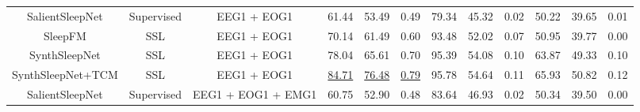 \begin{table*}[!htbp]
{{\begin{tabular}{c|c|c|ccc|ccc|ccc}
\hline
SalientSleepNet \cite{ref9}                                                                       & Supervised                                                                                 & EEG1
  + EOG1                              & 61.44          & 53.49          & 0.49                                                                      & 79.34          & 45.32          & 0.02                                                          & 50.22          & 39.65          & 0.01                                                             \\
SleepFM \cite{ref23}                                                                                & SSL                                                                                        & EEG1
  + EOG1                              & 70.14          & 61.49          & 0.60                                                                      & 93.48          & 52.02          & 0.07                                                          & 50.95          & 39.77          & 0.00                                                             \\
SynthSleepNet                                                                          & SSL                                                                                        & EEG1
  + EOG1                              & 78.04          & 65.61          & 0.70                                                                      & 95.39          & 54.08          & 0.10                                                          & 63.87          & 49.33          & 0.10                                                             \\
SynthSleepNet+TCM                                                                      & SSL                                                                                        & EEG1
  + EOG1                              & \uline{84.71}  & \uline{76.48}  & \uline{0.79}                                                              & 95.78          & 54.64          & 0.11                                                          & 65.93          & 50.82          & 0.12                                                             \\ 
\hline
SalientSleepNet \cite{ref9}                                                                       & Supervised                                                                                 & EEG1
  + EOG1 + EMG1                       & 60.75          & 52.90          & 0.48                                                                      & 83.64          & 46.93          & 0.02                                                          & 50.34          & 39.50          & 0.00                                                             \\

\end{tabular}}}
\end{table*}
